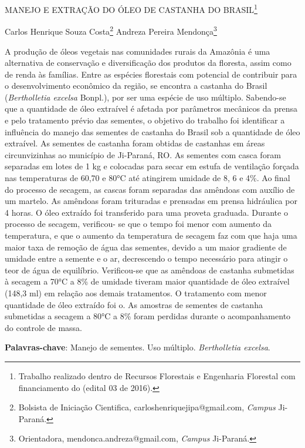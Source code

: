 \documentclass[article,12pt,onesidea,4paper,english,brazil]{abntex2}
\begin{document}
	
	
	\frenchspacing 
	
	\begin{center}
		\LARGE MANEJO E EXTRAÇÃO DO ÓLEO DE CASTANHA DO BRASIL\footnote{Trabalho realizado dentro de Recursos Florestais e Engenharia Florestal com financiamento do (edital 03 de 2016).}
		
		\normalsize
		Carlos Henrique Souza Costa\footnote{Bolsista de Iniciação Cientifica, carloshenriquejipa@gmail.com, \textit{Campus} Ji-Paraná.} 
		Andreza Pereira Mendonça\footnote{Orientadora, mendonca.andreza@gmail.com, \textit{Campus} Ji-Paraná.}
	\end{center}
	
	\noindent A produção de óleos vegetais nas comunidades rurais da Amazônia é uma
	alternativa de conservação e diversificação dos produtos da floresta, assim como de
	renda às famílias. Entre as espécies florestais com potencial de contribuir para o
	desenvolvimento econômico da região, se encontra a castanha do Brasil
	(\textit{Bertholletia excelsa} Bonpl.), por ser uma espécie de uso múltiplo. Sabendo-se que
	a quantidade de óleo extraível é afetada por parâmetros mecânicos da prensa e pelo
	tratamento prévio das sementes, o objetivo do trabalho foi identificar a influência do
	manejo das sementes de castanha do Brasil sob a quantidade de óleo extraível. As
	sementes de castanha foram obtidas de castanhas em áreas circunvizinhas ao
	município de Ji-Paraná, RO. As sementes com casca foram separadas em lotes de 1
	kg e colocadas para secar em estufa de ventilação forçada nas temperaturas de
	60,70 e 80°C até atingirem umidade de 8, 6 e 4\%. Ao final do processo de secagem,
	as cascas foram separadas das amêndoas com auxílio de um martelo. As amêndoas
	foram trituradas e prensadas em prensa hidráulica por 4 horas. O óleo extraído foi
	transferido para uma proveta graduada. Durante o processo de secagem, verificou-
	se que o tempo foi menor com aumento da temperatura, e que o aumento da
	temperatura de secagem faz com que haja uma maior taxa de remoção de água das
	sementes, devido a um maior gradiente de umidade entre a semente e o ar,
	decrescendo o tempo necessário para atingir o teor de água de equilíbrio. Verificou-se que as amêndoas de castanha submetidas à secagem a 70°C a 8\% de umidade	
	tiveram maior quantidade de óleo extraível (148,3 ml) em relação aos demais
	tratamentos. O tratamento com menor quantidade de óleo extraído foi o. As
	amostras de sementes de castanha submetidas a secagem a 80°C a 8\% foram
	perdidas durante o acompanhamento do controle de massa.
	
	\vspace{\onelineskip}
	
	\noindent
	\textbf{Palavras-chave}: Manejo de sementes. Uso múltiplo. \textit{Bertholletia excelsa}.
		
\end{document}
